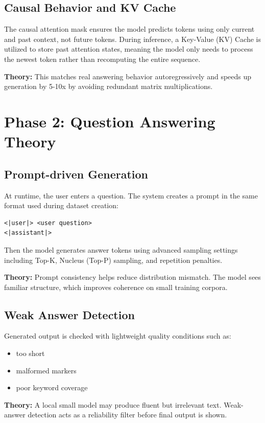\documentclass[a4paper,11pt]{article}
\begin{document}
\subsection{Causal Behavior and KV Cache}
The causal attention mask ensures the model predicts tokens using only current and past context, not future tokens. During inference, a Key-Value (KV) Cache is utilized to store past attention states, meaning the model only needs to process the newest token rather than recomputing the entire sequence.

\textbf{Theory:}
This matches real answering behavior autoregressively and speeds up generation by 5-10x by avoiding redundant matrix multiplications.

\section{Phase 2: Question Answering Theory}
\subsection{Prompt-driven Generation}
At runtime, the user enters a question.
The system creates a prompt in the same format used during dataset creation:
\begin{verbatim}
<|user|> <user question>
<|assistant|>
\end{verbatim}
Then the model generates answer tokens using advanced sampling settings including Top-K, Nucleus (Top-P) sampling, and repetition penalties.

\textbf{Theory:}
Prompt consistency helps reduce distribution mismatch.
The model sees familiar structure, which improves coherence on small training corpora.

\subsection{Weak Answer Detection}
Generated output is checked with lightweight quality conditions such as:
\begin{itemize}[leftmargin=1.5em]
    \item too short
    \item malformed markers
    \item poor keyword coverage
\end{itemize}

\textbf{Theory:}
A local small model may produce fluent but irrelevant text.
Weak-answer detection acts as a reliability filter before final output is shown.
\end{document}
